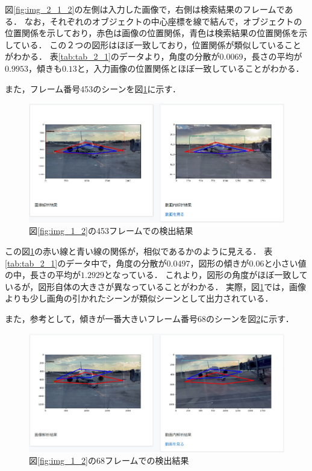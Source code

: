\documentclass[a4j,12pt,dvipdfmx]{jreport}
\begin{document}
図\ref{fig:img_2_1_2}の左側は入力した画像で，右側は検索結果のフレームである．
なお，それぞれのオブジェクトの中心座標を線で結んで，オブジェクトの位置関係を示しており，赤色は画像の位置関係，青色は検索結果の位置関係を示している．
この２つの図形はほぼ一致しており，位置関係が類似していることがわかる．
表\ref{tab:tab_2_1}のデータより，角度の分散が$0.0069$，長さの平均が$0.9953$，傾きも$0.13$と，入力画像の位置関係とほぼ一致していることがわかる．

また，フレーム番号453のシーンを図\ref{fig:img_2_1_3}に示す．

\begin{figure}[H]
  \centering
  \includegraphics[width=13cm]{image/result_2_1_3.jpg}
  \caption{図\ref{fig:img_1_2}の453フレームでの検出結果}
  \label{fig:img_2_1_3}
\end{figure}

この図\ref{fig:img_2_1_3}の赤い線と青い線の関係が，相似であるかのように見える．
表\ref{tab:tab_2_1}のデータ中で，角度の分散が$0.0497$，図形の傾きが$0.06$と小さい値の中，長さの平均が$1.2929$となっている．
これより，図形の角度がほぼ一致しているが，図形自体の大きさが異なっていることがわかる．
実際，図\ref{fig:img_2_1_3}では，画像よりも少し画角の引かれたシーンが類似シーンとして出力されている．

また，参考として，傾きが一番大きいフレーム番号68のシーンを図\ref{fig:img_2_1_4}に示す．
\begin{figure}[H]
  \centering
  \includegraphics[width=13cm]{image/result_2_1_4.jpg}
  \caption{図\ref{fig:img_1_2}の68フレームでの検出結果}
  \label{fig:img_2_1_4}
\end{figure}
\end{document}
